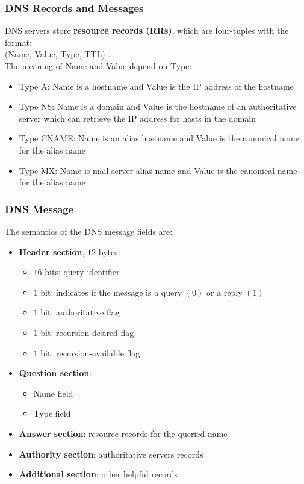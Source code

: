 \documentclass{article}
\begin{document}
\subsubsection{DNS Records and Messages}
DNS servers store \textbf{resource records (RRs)}, which are four-tuples with the format: \\
\color{gray}
(Name, Value, Type, TTL)
\color{black} . \\
The meaning of \color{gray} Name \color{black} and \color{gray} Value \color{black} depend on \color{gray} Type\color{black}:
\begin{itemize}
    \item \color{gray}Type A\color{black}: \color{gray}Name \color{black} is a hostname and \color{gray}Value \color{black} is the IP address of the hostname
    \item \color{gray}Type NS\color{black}: \color{gray}Name \color{black} is a domain and \color{gray}Value \color{black} is the hostname of an authoritative server which can retrieve the IP address for hosts in the domain
    \item \color{gray}Type CNAME\color{black}: \color{gray}Name \color{black} is an alias hostname and \color{gray}Value \color{black} is the canonical name for the alias name
    \item \color{gray}Type MX\color{black}: \color{gray}Name \color{black} is mail server alias name and \color{gray}Value \color{black} is the canonical name for the alias name
\end{itemize}
\subsubsection*{DNS Message}
The semantics of the DNS message fields are:
\begin{itemize}
    \item \textbf{Header section}, $ 12 $ bytes:
    \begin{itemize}
        \item $ 16 $ bits: query identifier
        \item $ 1 $ bit: indicates if the message is a query $(0)$ or a reply $(1)$
        \item $ 1 $ bit: authoritative flag
        \item $ 1 $ bit: recursion-desired flag
        \item $ 1 $ bit: recursion-available flag
    \end{itemize}
    \item \textbf{Question section}:
        \begin{itemize}
            \item Name field
            \item Type field
        \end{itemize}
    \item \textbf{Answer section}: resource records for the queried name
    \item \textbf{Authority section}: authoritative servers records
    \item \textbf{Additional section}: other helpful records
\end{itemize}
\end{document}
